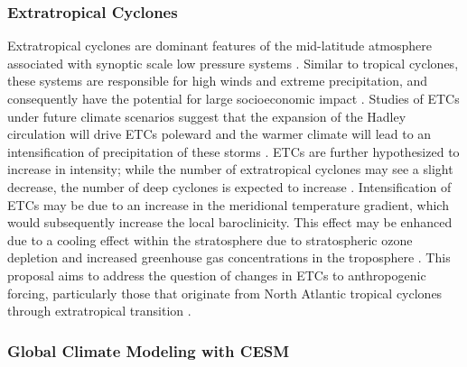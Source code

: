 \documentclass[11pt]{article}
\begin{document}
\subsubsection{Extratropical Cyclones}

Extratropical cyclones are dominant features of the mid-latitude atmosphere associated with synoptic scale low pressure systems \citep{serreze1995climatological}.  Similar to tropical cyclones, these systems are responsible for high winds and extreme precipitation, and consequently have the potential for large socioeconomic impact \citep{ulbrich2009extra}.  Studies of ETCs under future climate scenarios suggest that the expansion of the Hadley circulation will drive ETCs poleward \citep{bengtsson2006storm} and the warmer climate will lead to an intensification of precipitation of these storms \citep{bengtsson2009will, zappa2013multi}.  ETCs are further hypothesized to increase in intensity; while the number of extratropical cyclones may see a slight decrease, the number of deep cyclones is expected to increase \citep{ulbrich2009extra}. Intensification of ETCs may be due to an increase in the meridional temperature gradient, which would subsequently increase the local baroclinicity. This effect may be enhanced due to a cooling effect within the stratosphere due to stratospheric ozone depletion and increased greenhouse gas concentrations in the troposphere \citep{vose2014monitoring}.  This proposal aims to address the question of changes in ETCs to anthropogenic forcing, particularly those that originate from North Atlantic tropical cyclones through extratropical transition \citep{hart2001climatology,evans2003}.  

\subsubsection{Global Climate Modeling with CESM} \label{sec:cesm-description}
\end{document}
